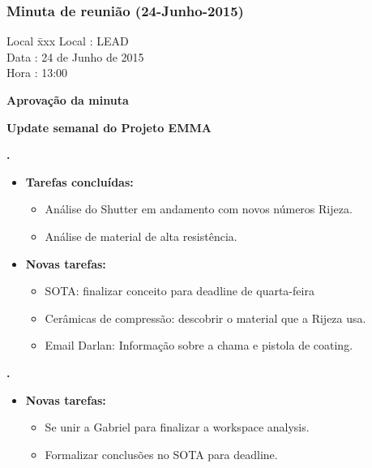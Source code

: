\subsubsection{Minuta de reunião (24-Junho-2015)}

\begin{tabbing}
  Local \= xxx \kill
  Local \> : LEAD \\
  Data  \> : 24 de Junho de 2015 \\
  Hora  \> : 13:00
\end{tabbing}


\textbf{Aprovação da minuta}

\textbf{Update semanal do Projeto EMMA}
  
		
\textbf{\elael.} 
	\begin{itemize}
		\item \textbf{Tarefas concluídas:}
			\begin{itemize}    
				\item Análise do Shutter em andamento com novos números Rijeza.
				\item Análise de material de alta resistência. 
			\end{itemize}
		
		\item \textbf{Novas tarefas:}
			\begin{itemize} 
				\item SOTA: finalizar conceito para deadline de quarta-feira 
				\item Cerâmicas de compressão: descobrir o material que a Rijeza usa.
				\item Email Darlan: Informação sobre a chama e pistola de coating.
			\end{itemize}
	\end{itemize}
	
	\textbf{\renan.} 
	\begin{itemize}
		\item \textbf{Novas tarefas:}
			\begin{itemize} 
				\item Se unir a Gabriel para finalizar a workspace analysis.
				\item Formalizar conclusões no SOTA para deadline.
			\end{itemize}
	\end{itemize}
					
